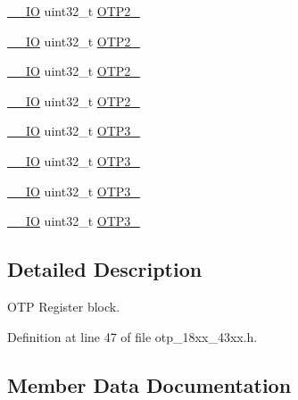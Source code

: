 \begin{DoxyCompactItemize}
\item 
\hyperlink{core__sc300_8h_aec43007d9998a0a0e01faede4133d6be}{\+\_\+\+\_\+\+IO} uint32\+\_\+t \hyperlink{struct_l_p_c___o_t_p___t_ad71d8faea7d74003e40691beba4577ab}{O\+T\+P2\+\_}
\item 
\hyperlink{core__sc300_8h_aec43007d9998a0a0e01faede4133d6be}{\+\_\+\+\_\+\+IO} uint32\+\_\+t \hyperlink{struct_l_p_c___o_t_p___t_a60436977035b0a112b2028aece0425e8}{O\+T\+P2\+\_}
\item 
\hyperlink{core__sc300_8h_aec43007d9998a0a0e01faede4133d6be}{\+\_\+\+\_\+\+IO} uint32\+\_\+t \hyperlink{struct_l_p_c___o_t_p___t_aac5c0998bc11d126e38bdfd5cafbae8f}{O\+T\+P2\+\_}
\item 
\hyperlink{core__sc300_8h_aec43007d9998a0a0e01faede4133d6be}{\+\_\+\+\_\+\+IO} uint32\+\_\+t \hyperlink{struct_l_p_c___o_t_p___t_ae45317b08e121d537a979c4f841cc113}{O\+T\+P2\+\_}
\item 
\hyperlink{core__sc300_8h_aec43007d9998a0a0e01faede4133d6be}{\+\_\+\+\_\+\+IO} uint32\+\_\+t \hyperlink{struct_l_p_c___o_t_p___t_afbb408a110067bb390d71718391d27eb}{O\+T\+P3\+\_}
\item 
\hyperlink{core__sc300_8h_aec43007d9998a0a0e01faede4133d6be}{\+\_\+\+\_\+\+IO} uint32\+\_\+t \hyperlink{struct_l_p_c___o_t_p___t_a00abd2bcfd9de419a961b64442f7433f}{O\+T\+P3\+\_}
\item 
\hyperlink{core__sc300_8h_aec43007d9998a0a0e01faede4133d6be}{\+\_\+\+\_\+\+IO} uint32\+\_\+t \hyperlink{struct_l_p_c___o_t_p___t_a2a7d5da3fbe0b23569747ca80e1f9063}{O\+T\+P3\+\_}
\item 
\hyperlink{core__sc300_8h_aec43007d9998a0a0e01faede4133d6be}{\+\_\+\+\_\+\+IO} uint32\+\_\+t \hyperlink{struct_l_p_c___o_t_p___t_a19718c242427f73aa346d3a5b10eddec}{O\+T\+P3\+\_}
\end{DoxyCompactItemize}


\subsection{Detailed Description}
O\+TP Register block. 

Definition at line 47 of file otp\+\_\+18xx\+\_\+43xx.\+h.



\subsection{Member Data Documentation}
\mbox{\label{struct_l_p_c___o_t_p___t_aa229fdc4aff3eaac707ab2bfaccc75d4}} 
